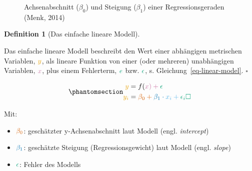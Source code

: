 \documentclass[
  letterpaper,
  twoside,
  open=any]{scrbook}
\providecommand{\tightlist}{%
  \setlength{\itemsep}{0pt}\setlength{\parskip}{0pt}}\usepackage{longtable,booktabs,array}
\theoremstyle{definition}
\newtheorem{definition}{Definition}[chapter]
\theoremstyle{definition}
\theoremstyle{definition}
\theoremstyle{remark}
\begin{document}
\begin{figure}


\caption{\label{fig-regrtex}Achsenabschnitt (\(\beta_0\)) und Steigung
(\(\beta_1\)) einer Regressionsgeraden (Menk, 2014)}

\end{figure}%

\begin{definition}[Das einfache lineare
Modell]\protect\hypertarget{def-einfache-lineare-modell}{}\label{def-einfache-lineare-modell}

Das einfache lineare Modell beschreibt den Wert einer abhängigen
metrischen Variablen, \(\color{ycol}{y}\), als lineare Funktion von
einer (oder mehreren) unabhängigen Variablen, \(\color{xcol}{x}\), plus
einem Fehlerterm, \(\color{errorcol}{e}\) bzw.
\(\color{errorcol}{\epsilon}\), s. Gleichung~\ref{eq-linear-model}.
\(\square\)

\end{definition}

\begin{equation}\phantomsection\label{eq-linear-model}{\begin{aligned}
\color{ycol}{y} &= f(\color{xcol}{x}) + \color{errorcol}{\epsilon} \\
\color{ycol}{y_i} &= \color{beta0col}{\beta_0} + \color{beta1col}{\beta_1} \cdot \color{modelcol}{x_i} + \color{errorcol}{\epsilon_i} \square
\end{aligned}}\end{equation}

Mit:

\begin{itemize}
\tightlist
\item
  \(\color{beta0col}{\beta_0}\): geschätzter y-Achsenabschnitt laut
  Modell (engl. \emph{intercept})
\item
  \(\color{beta1col}{\beta_1}\): geschätzte Steigung
  (Regressionsgewicht) laut Modell (engl. \emph{slope})
\item
  \(\color{errorcol}{\epsilon}\): Fehler des Modells
\end{itemize}
\end{document}
